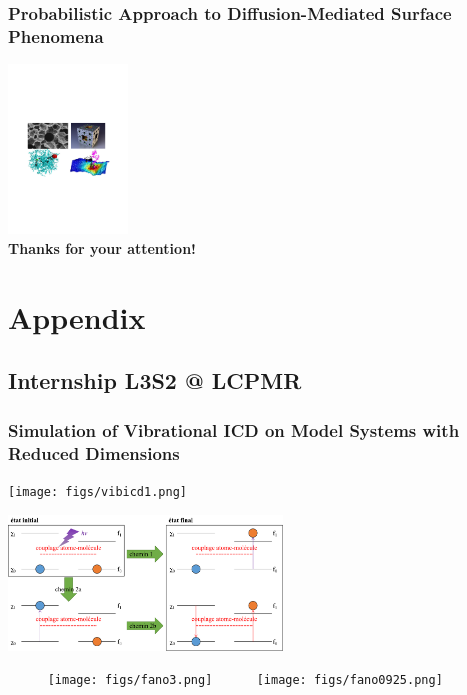 \documentclass[9pt]{beamer}
\newcommand{\fives}{\ \ \ \ \ }
\newcommand{\ssc}{\subsection}
\newcommand{\tbf}{\textbf}
\begin{document}
\section{}
\begin{frame}[noframenumbering]
\thispagestyle{empty}
\frametitle{\tbf{Probabilistic Approach to Diffusion-Mediated Surface Phenomena}}
	\begin{center}
	\includegraphics[height=4.5cm]{figs/PhD_project_final_figs.pdf} \\[6ex]
	\textbf{\Huge{Thanks for your attention!}} \\[6ex]
	  
	\end{center}
\end{frame}








\section{Appendix}


\ssc{Internship L3S2 @ LCPMR}
\begin{frame}[noframenumbering]
\frametitle{Simulation of Vibrational ICD on Model Systems with Reduced Dimensions}

	\begin{minipage}{0.24\linewidth}
	\begin{center}
		\texttt{[image: figs/vibicd1.png]}
	\end{center}
	\end{minipage}
	\begin{minipage}{0.75\linewidth}
	\begin{center}
		\includegraphics[height = 3.6cm]{figs/vibicd2.png}
	\end{center}
	\end{minipage}
	
\fives
		\texttt{[image: figs/fano3.png]}
		\fives
		\texttt{[image: figs/fano0925.png]}

\end{frame}
\end{document}
